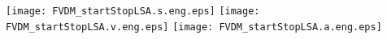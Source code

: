 \documentclass[a4paper,12pt]{article}
\begin{document}

\begin{center}
\texttt{[image: FVDM\_startStopLSA.s.eng.eps]} 
\texttt{[image: FVDM\_startStopLSA.v.eng.eps]}
\texttt{[image: FVDM\_startStopLSA.a.eng.eps]}
\end{center}

\end{document}
